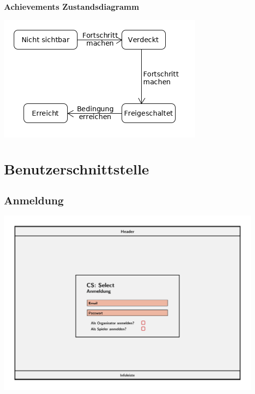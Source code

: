 \documentclass[a4paper]{scrreprt}
\begin{document}
    \subsection{Achievements Zustandsdiagramm}
    \label{fig:Achievment_State}
    \includegraphics[width=\textwidth]{uml/export/Achievment_State.png}
    

    \chapter{Benutzerschnittstelle}

    \section{Anmeldung}
    \centering
    \includegraphics[width=\textwidth]{../pictures/Anmeldung.jpg}
\end{document}
